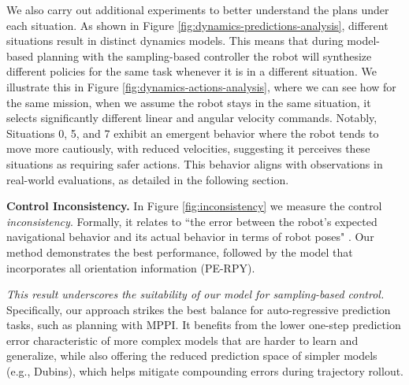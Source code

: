 \documentclass[Afour,sageh,times]{sagej}
\theoremstyle{lemma}
\begin{document}
We also carry out additional experiments to better understand the plans under each situation. As shown in Figure \ref{fig:dynamics-predictions-analysis}, different situations result in distinct dynamics models. This means that during model-based planning with the sampling-based controller the robot will synthesize different policies for the same task whenever it is in a different situation. We illustrate this in Figure \ref{fig:dynamics-actions-analysis}, where we can see how for the same mission, when we assume the robot stays in the same situation, it selects significantly different linear and angular velocity commands. 
Notably, Situations 0, 5, and 7 exhibit an emergent behavior where the robot tends to move more cautiously, with reduced velocities, suggesting it perceives these situations as requiring safer actions. This behavior aligns with observations in real-world evaluations, as detailed in the following section.


\textbf{Control Inconsistency.} In Figure \ref{fig:inconsistency} we measure the control \textit{inconsistency}. Formally, it relates to ``the error between the robot’s expected navigational behavior and its actual behavior in terms of robot poses" \cite[]{siva2024self}. Our method demonstrates the best performance, followed by the model that incorporates all orientation information (PE-RPY). 

\textit{This result underscores the suitability of our model for sampling-based control.} Specifically, our approach strikes the best balance for auto-regressive prediction tasks, such as planning with MPPI. It benefits from the lower one-step prediction error characteristic of more complex models that are harder to learn and generalize, while also offering the reduced prediction space of simpler models (e.g., Dubins), which helps mitigate compounding errors during trajectory rollout.
\end{document}
